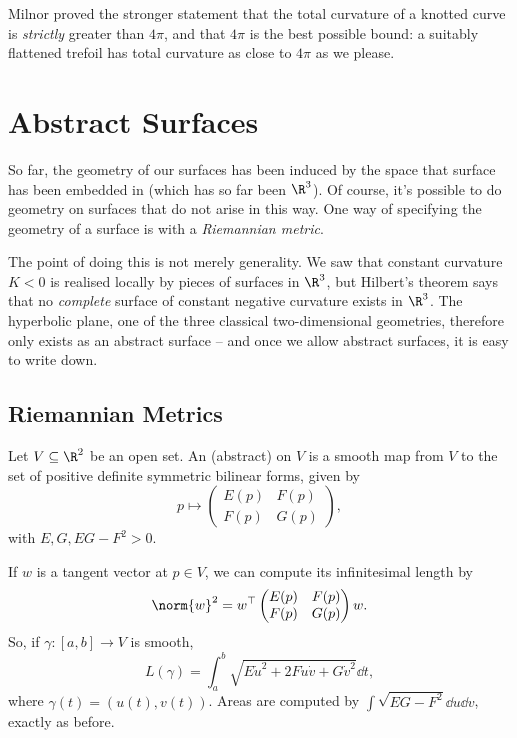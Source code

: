 \begin{remark}
    Milnor proved the stronger statement that the total curvature of a knotted curve is \emph{strictly} greater than $4\pi$, and that $4\pi$ is the best possible bound: a suitably flattened trefoil has total curvature as close to $4\pi$ as we please.
\end{remark}

\section{Abstract Surfaces}

So far, the geometry of our surfaces has been induced by the space that surface has been embedded in (which has so far been $\R^3$). Of course, it's possible to do geometry on surfaces that do not arise in this way. One way of specifying the geometry of a surface is with a \emph{Riemannian metric}.

The point of doing this is not merely generality. We saw that constant curvature $K < 0$ is realised locally by pieces of surfaces in $\R^3$, but Hilbert's theorem says that no \emph{complete} surface of constant negative curvature exists in $\R^3$. The hyperbolic plane, one of the three classical two-dimensional geometries, therefore only exists as an abstract surface -- and once we allow abstract surfaces, it is easy to write down.

\subsection{Riemannian Metrics}

\begin{definition}
    Let $V \subseteq \R^2$ be an open set. An (abstract)  on $V$ is a smooth map from $V$ to the set of positive definite symmetric bilinear forms, given by
    $$
    p \mapsto \begin{pmatrix}
        E(p) & F(p) \\
        F(p) & G(p)
    \end{pmatrix},
    $$
    with $E, G, EG - F^2 > 0$.
\end{definition}

If $w$ is a tangent vector at $p \in V$, we can compute its infinitesimal length by
$$
\norm{w}^2 = w^\top \begin{pmatrix}
    E(p) & F(p) \\ F(p) & G(p)
\end{pmatrix} w.
$$
So, if $\gamma: [a, b] \rightarrow V$ is smooth,
$$
L(\gamma) = \int_a^b \sqrt{E \dot{u}^2 + 2F \dot{u}\dot{v} + G \dot{v}^2} \dd t,
$$
where $\gamma(t) = (u(t), v(t))$. Areas are computed by $\int\sqrt{EG-F^2}\dd u \dd v$, exactly as before.


